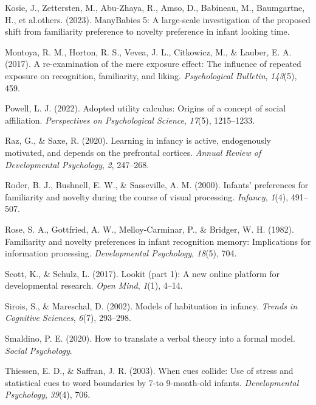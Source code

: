 \documentclass[10pt, letterpaper]{article}
\newenvironment{CSLReferences}%
  {}%
  {\par}
\begin{document}
\begin{CSLReferences}{1}{0}
\leavevmode{}%
Kosie, J., Zettersten, M., Abu-Zhaya, R., Amso, D., Babineau, M.,
Baumgartne, H., et al.others. (2023). ManyBabies 5: A large-scale
investigation of the proposed shift from familiarity preference to
novelty preference in infant looking time.

\leavevmode{}%
Montoya, R. M., Horton, R. S., Vevea, J. L., Citkowicz, M., \& Lauber,
E. A. (2017). A re-examination of the mere exposure effect: The
influence of repeated exposure on recognition, familiarity, and liking.
\emph{Psychological Bulletin}, \emph{143}(5), 459.

\leavevmode{}%
Powell, L. J. (2022). Adopted utility calculus: Origins of a concept of
social affiliation. \emph{Perspectives on Psychological Science},
\emph{17}(5), 1215--1233.

\leavevmode{}%
Raz, G., \& Saxe, R. (2020). Learning in infancy is active, endogenously
motivated, and depends on the prefrontal cortices. \emph{Annual Review
of Developmental Psychology}, \emph{2}, 247--268.

\leavevmode{}%
Roder, B. J., Bushnell, E. W., \& Sasseville, A. M. (2000). Infants'
preferences for familiarity and novelty during the course of visual
processing. \emph{Infancy}, \emph{1}(4), 491--507.

\leavevmode{}%
Rose, S. A., Gottfried, A. W., Melloy-Carminar, P., \& Bridger, W. H.
(1982). Familiarity and novelty preferences in infant recognition
memory: Implications for information processing. \emph{Developmental
Psychology}, \emph{18}(5), 704.

\leavevmode{}%
Scott, K., \& Schulz, L. (2017). Lookit (part 1): A new online platform
for developmental research. \emph{Open Mind}, \emph{1}(1), 4--14.

\leavevmode{}%
Sirois, S., \& Mareschal, D. (2002). Models of habituation in infancy.
\emph{Trends in Cognitive Sciences}, \emph{6}(7), 293--298.

\leavevmode{}%
Smaldino, P. E. (2020). How to translate a verbal theory into a formal
model. \emph{Social Psychology}.

\leavevmode{}%
Thiessen, E. D., \& Saffran, J. R. (2003). When cues collide: Use of
stress and statistical cues to word boundaries by 7-to 9-month-old
infants. \emph{Developmental Psychology}, \emph{39}(4), 706.


\end{CSLReferences}
\end{document}
